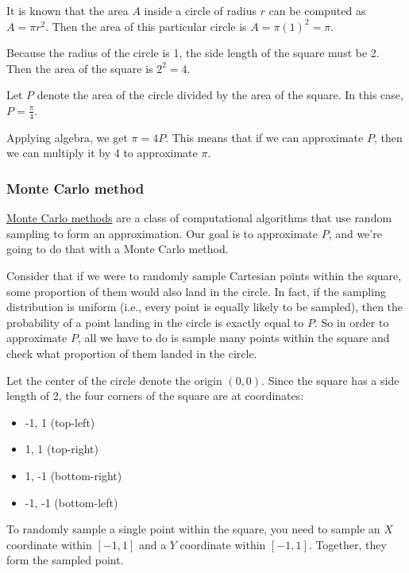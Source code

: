 \documentclass{article}
\begin{document}
It is known that the area $A$ inside a circle of radius $r$ can be computed as $A = \pi r^2$. Then the area of this particular circle is $A = \pi (1)^2 = \pi$.

Because the radius of the circle is 1, the side length of the square must be 2. Then the area of the square is $2^2 = 4$.

Let $P$ denote the area of the circle divided by the area of the square. In this case, $P = \frac{\pi}{4}$.

Applying algebra, we get $\pi = 4P$. This means that if we can approximate $P$, then we can multiply it by 4 to approximate $\pi$.

\subsubsection{Monte Carlo method}

\href{https://en.wikipedia.org/wiki/Monte_Carlo_method#:~:text=Monte%20Carlo%20methods%2C%20or%20Monte,might%20be%20deterministic%20in%20principle}{Monte Carlo methods} are a class of computational algorithms that use random sampling to form an approximation. Our goal is to approximate $P$, and we're going to do that with a Monte Carlo method.

Consider that if we were to randomly sample Cartesian points within the square, some proportion of them would also land in the circle. In fact, if the sampling distribution is uniform (i.e., every point is equally likely to be sampled), then the probability of a point landing in the circle is exactly equal to $P$. So in order to approximate $P$, all we have to do is sample many points within the square and check what proportion of them landed in the circle.

Let the center of the circle denote the origin $(0, 0)$. Since the square has a side length of 2, the four corners of the square are at coordinates:

\begin{itemize}
    \item -1, 1 (top-left)
    \item 1, 1 (top-right)
    \item 1, -1 (bottom-right)
    \item -1, -1 (bottom-left)
\end{itemize}

To randomly sample a single point within the square, you need to sample an $X$ coordinate within $[-1, 1]$ and a $Y$ coordinate within $[-1, 1]$. Together, they form the sampled point.
\end{document}
